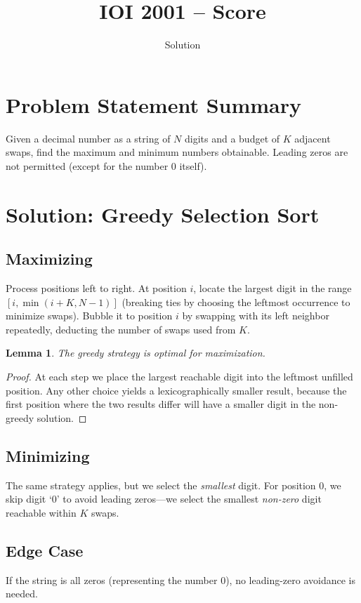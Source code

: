 \documentclass[11pt,a4paper]{article}
\title{IOI 2001 -- Score}
\author{Solution}
\date{}
\newtheorem{lemma}[theorem]{Lemma}
\begin{document}
\maketitle

\section{Problem Statement Summary}
Given a decimal number as a string of $N$ digits and a budget of $K$
adjacent swaps, find the maximum and minimum numbers obtainable.
Leading zeros are not permitted (except for the number 0 itself).

\section{Solution: Greedy Selection Sort}

\subsection{Maximizing}
Process positions left to right. At position $i$, locate the largest
digit in the range $[i, \min(i+K, N-1)]$ (breaking ties by choosing
the leftmost occurrence to minimize swaps). Bubble it to position $i$
by swapping with its left neighbor repeatedly, deducting the number of
swaps used from $K$.

\begin{lemma}
The greedy strategy is optimal for maximization.
\end{lemma}
\begin{proof}
At each step we place the largest reachable digit into the
leftmost unfilled position. Any other choice yields a lexicographically
smaller result, because the first position where the two results differ
will have a smaller digit in the non-greedy solution.
\end{proof}

\subsection{Minimizing}
The same strategy applies, but we select the \emph{smallest} digit.
For position 0, we skip digit `0' to avoid leading zeros---we select
the smallest \emph{non-zero} digit reachable within $K$ swaps.

\subsection{Edge Case}
If the string is all zeros (representing the number 0), no leading-zero
avoidance is needed.
\end{document}
